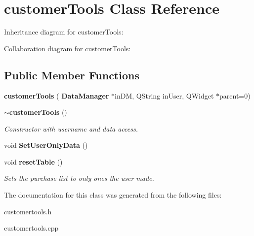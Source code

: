 \section{customer\+Tools Class Reference}
\label{classcustomer_tools}


Inheritance diagram for customer\+Tools\+:


Collaboration diagram for customer\+Tools\+:
\subsection*{Public Member Functions}
\begin{DoxyCompactItemize}
\item 
\mbox{\label{classcustomer_tools_a0c09b600d0f45982a094bb1d5619814f}} 
{\bfseries customer\+Tools} (\textbf{ Data\+Manager} $\ast$in\+DM, Q\+String in\+User, Q\+Widget $\ast$parent=0)
\item 
\mbox{\label{classcustomer_tools_a30892170efdc6e0eaf07a699be421274}} 
\textbf{ $\sim$customer\+Tools} ()
\begin{DoxyCompactList}\small\item\em Constructor with username and data access. \end{DoxyCompactList}\item 
\mbox{\label{classcustomer_tools_adad8a16be1f144643d5e3f5a6b24354a}} 
void {\bfseries Set\+User\+Only\+Data} ()
\item 
\mbox{\label{classcustomer_tools_a509af2be8962ad4d744b3cde28d475f5}} 
void \textbf{ reset\+Table} ()
\begin{DoxyCompactList}\small\item\em Sets the purchase list to only ones the user made. \end{DoxyCompactList}\end{DoxyCompactItemize}


The documentation for this class was generated from the following files\+:\begin{DoxyCompactItemize}
\item 
customertools.\+h\item 
customertools.\+cpp\end{DoxyCompactItemize}
